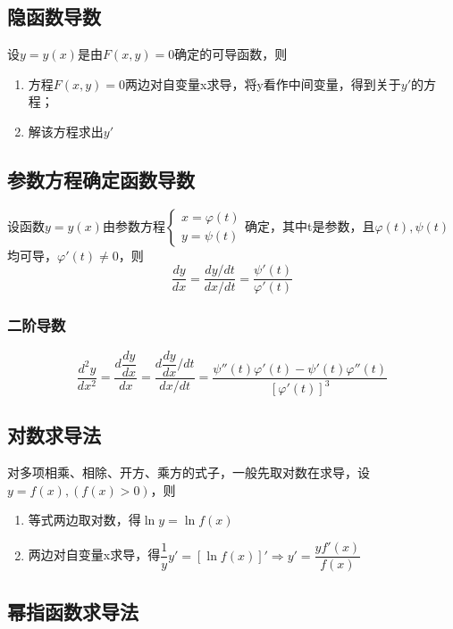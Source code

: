 \subsection{隐函数导数}

设\(y = y(x)\)是由\(F(x, y) = 0\)确定的可导函数，则\begin{enumerate}
    \item 方程\(F(x, y) = 0\)两边对自变量x求导，将y看作中间变量，得到关于\(y'\)的方程；
    \item 解该方程求出\(y'\)
\end{enumerate}


\subsection{参数方程确定函数导数}

设函数\(y = y(x)\)由参数方程\(\begin{cases}
x = \varphi(t) \\ 
y = \psi(t)
\end{cases}\)确定，其中t是参数，且\(\varphi(t), \psi(t)\)均可导，\(\varphi'(t) \neq 0\)，则\[\dfrac{dy}{dx} = \dfrac{dy/dt}{dx/dt} = \dfrac{\psi'(t)}{\varphi'(t)}\]

\subsubsection{二阶导数}

\[\dfrac{d^2y}{dx^2} = \dfrac{d\dfrac{dy}{dx}}{dx} = \dfrac{d\dfrac{dy}{dx} / dt}{dx / dt} = \dfrac{\psi''(t)\varphi'(t) - \psi'(t)\varphi''(t)}{[\varphi'(t)]^3}\]

\subsection{对数求导法}

对多项相乘、相除、开方、乘方的式子，一般先取对数在求导，设\(y = f(x), (f(x) > 0)\)，则\begin{enumerate}
    \item 等式两边取对数，得\(\ln y = \ln f(x)\)
    \item 两边对自变量x求导，得\(\dfrac{1}{y}y' = [\ln f(x)]' \Rightarrow y' = \dfrac{yf'(x)}{f(x)}\)
\end{enumerate}


\subsection{幂指函数求导法}

